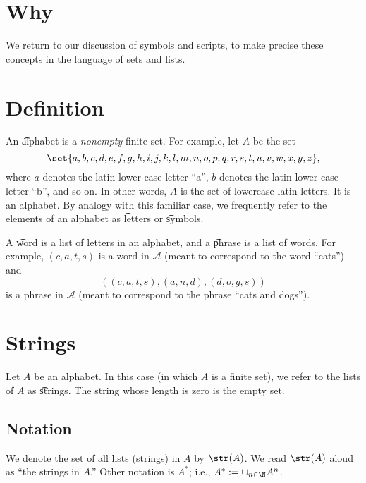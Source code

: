 
\section*{Why}

We return to our discussion of symbols and scripts, to make precise these concepts in the language of sets and lists.

\section*{Definition}

An \t{alphabet} is a \textit{nonempty} finite set.
For example, let $A$ be the set
\[
\set{a, b, c, d, e, f,g,h,i,j,k,l,m,n,o,p,q,r,s,t,u,v,w, x, y,z},
\]
where $a$ denotes the latin lower case letter ``a'', $b$ denotes the latin lower case letter ``b'', and so on.
In other words, $A$ is the set of lowercase latin letters.
It is an alphabet.
By analogy with this familiar case, we frequently refer to the elements of an alphabet as \t{letters} or \t{symbols}.

A \t{word} is a list of letters in an alphabet, and a \t{phrase} is a list of words.
For example, $(c,a,t,s)$ is a word in $\mathcal{A} $ (meant to correspond to the word ``cats'') and
\[
((c,a,t,s), (a,n,d), (d,o,g,s))
\]
is a phrase in $\mathcal{A} $ (meant to correspond to the phrase ``cats and dogs'').

\section*{Strings}

Let $A$ be an alphabet.
In this case (in which $A$ is a finite set), we refer to the lists of $A$ as \t{strings}.
The string whose length is zero is the empty set.

\subsection*{Notation}

We denote the set of all lists (strings) in $A$ by $\str(A)$.
We read $\str(A)$ aloud as ``the strings in $A$.''
Other notation is $A^*$; i.e., $A^* := \cup_{n \in \N  } A^n$.

